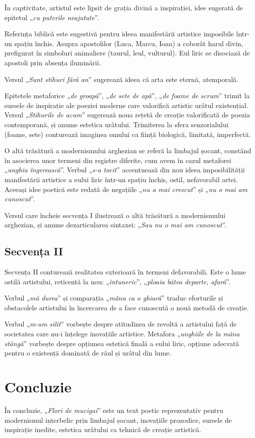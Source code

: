 \documentclass{article}
\newcommand{\qu}[1]{„\emph{#1}”}
\begin{document}
În captivitate, artistul este lipsit de grația divină a inspirației, idee sugerată de epitetul \qu{cu puterile neajutate}.

Referința biblică este sugestivă pentru ideea manifestării artistice imposibile într-un spațiu închis. Asupra apostolilor (Luca, Marcu, Ioan) a coborât harul divin, prefigurat în simboluri animaliere (taurul, leul, vulturul). Eul liric se disociază de apostoli prin absența iluminării.

Versul \qu{Sunt stihuri fără an} sugerează ideea că arta este eternă, atemporală.

Epitetele metaforice \qu{de groapă}, \qu{de sete de apă}, \qu{de foame de scrum} trimit la sursele de inspirație ale poeziei moderne care valorifică artistic urâtul existențial. Versul \qu{Stihurile de acum} sugerează noua rețetă de creație valorificată de poezia contemporană, și anume estetica urâtului. Trimiterea la sfera senzorialului (foame, sete) conturează imaginea omului ca ființă biologică, limitată, imperfectă.

O altă trăsătură a modernismului arghezian se referă la limbajul șocant, constând în asocierea unor termeni din registre diferite, cum avem în cazul metaforei \qu{unghia îngerească}. Verbul \qu{s-a tocit} accentuează din nou ideea imposibilității manifestării artistice a eului liric într-un spațiu închis, ostil, nefavorabil artei. Aceeași idee poetică este redată de negațiile \qu{nu a mai crescut} și \qu{nu o mai am cunoscut}.

Versul care încheie secvența I ilustrează o altă trăsătură a modernismului arghezian, și anume dezarticularea sintaxei: \qu{Sau nu o mai am cunoscut}.

\subsection{Secvența II}
Secvența II conturează realitatea exterioară în termeni defavorabili. Este o lume ostilă artistului, reticentă la nou: \qu{întuneric}, \qu{ploaia bătea departe, afară}.

Verbul \qu{mă durea} și comparația \qu{mâna ca o ghiară} traduc eforturile și obstacolele artistului în încercarea de a face cunoscută o nouă metodă de creație.

Verbul \qu{m-am silit} vorbește despre atitudinea de revoltă a artistului față de societatea care nu-i înțelege inovațiile artistice. Metafora \qu{unghiile de la mâna stângă} vorbește despre opțiunea estetică finală a eului liric, opțiune adecvată pentru o existență dominată de răul și urâtul din lume.

\section{Concluzie}
În concluzie, \qu{Flori de mucigai} este un text poetic reprezentativ pentru modernismul interbelic prin limbajul șocant, inovațiile prozodice, sursele de inspirație inedite, estetica urâtului ca tehnică de creație artistică.
\end{document}
